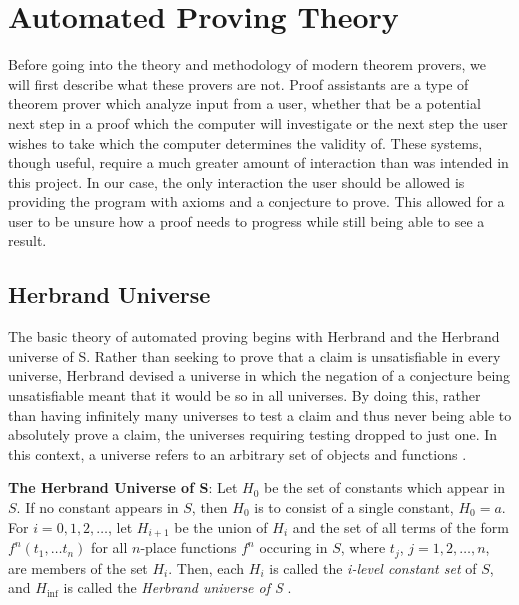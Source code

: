 \section{Automated Proving Theory}

Before going into the theory and methodology of modern theorem provers, we will first describe what these provers are not. Proof assistants are a type of theorem prover which analyze input from a user, whether that be a potential next step in a proof which the computer will investigate or the next step the user wishes to take which the computer determines the validity of. These systems, though useful, require a much greater amount of interaction than was intended in this project. In our case, the only interaction the user should be allowed is providing the program with axioms and a conjecture to prove. This allowed for a user to be unsure how a proof needs to progress while still being able to see a result.

\subsection{Herbrand Universe}
The basic theory of automated proving begins with Herbrand and the Herbrand universe of S. Rather than seeking to prove that a claim is unsatisfiable in every universe, Herbrand devised a universe in which the negation of a conjecture being unsatisfiable meant that it would be so in all universes. By doing this, rather than having infinitely many universes to test a claim and thus never being able to absolutely prove a claim, the universes requiring testing dropped to just one. In this context, a universe refers to an arbitrary set of objects and functions \cite{gelfond1988stable}.

\begin{definition}

	\textbf{The Herbrand Universe of S}: Let $H_0$ be the set of constants which appear in $S$. If no constant appears in $S$, then $H_0$ is to consist of a single constant, $H_0 = {a}$. For $i = 0, 1, 2, \ldots $, let $H_{i+1}$ be the union of $H_i$ and the set of all terms of the form $f^n(t_1, \ldots t_n)$ for all $n$-place functions $f^n$ occuring in $S$, where $t_j$, $j=1, 2, \ldots , n$, are members of the set $H_i$. Then, each $H_i$ is called the \textit{i-level constant set} of $S$, and $H_{\inf} $ is called the \textit{Herbrand universe of S} \cite{changLee}.


\end{definition}

